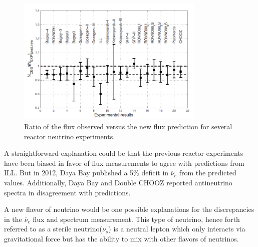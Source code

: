 \documentclass[11pt]{article}
\newcommand{\nuebar}{\ensuremath{\overline{\nu }_{e}} \hspace{1pt}}
\newcommand{\comment}[1]{}
\numberwithin{equation}{section}
\begin{document}
\begin{figure}
\centering
  \includegraphics[width=0.8\textwidth]{./Reactor_Anomaly.PNG}
\caption[Reactor antineutrino anomaly]{Ratio of the flux observed versus the new flux prediction for several reactor neutrino experiments.}
\label{fig:reactor_anomaly}
\end{figure}
A straightforward explanation could be that the previous reactor experiments have been biased in favor of flux measurements to agree with predictions from ILL. But in 2012, Daya Bay published a 5\% deficit in \nuebar from the predicted values. Additionally, Daya Bay and Double CHOOZ reported antineutrino spectra in disagreement with predictions. 

A new flavor of neutrino would be one possible explanations for the discrepancies in the \nuebar flux and spectrum measurement.  This type of neutrino, hence forth referred to as a sterile neutrino($\nu_{s}$) is a neutral lepton which only interacts via gravitational force but has the ability to mix with other flavors of neutrinos. 
\comment{Sterile neutrinos are also a natural explanation for several other discrepancies observed in other neutrino and cosmological experiments(cite).}
\end{document}

